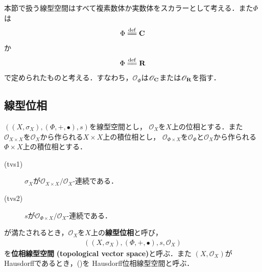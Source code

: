 	本節で扱う線型空間はすべて複素数体か実数体をスカラーとして考える．また$\Phi$は
	\begin{align}
		\Phi \defeq \C
	\end{align}
	か
	\begin{align}
		\Phi \defeq \R
	\end{align}
	で定められたものと考える．すなわち，$\mathscr{O}_\Phi$は$\mathscr{O}_{\mathbf{C}}$または$\mathscr{O}_{\mathbf{R}}$を指す．
	
\subsection{線型位相}
	\begin{screen}
		\begin{dfn}[位相線型空間]\label{def:topological_vector_space}
			$\left(\left(X,\sigma_X\right),(\Phi,+,\bullet),s\right)$を線型空間とし，
			$\mathscr{O}_X$を$X$上の位相とする．また
			$\mathscr{O}_{X \times X}$を$\mathscr{O}_X$から作られる$X \times X$上の積位相とし，
			$\mathscr{O}_{\Phi \times X}$を$\mathscr{O}_\Phi$と$\mathscr{O}_X$から作られる$\Phi \times X$上の積位相とする．
			\begin{description}
				\item[(tvs1)] $\sigma_X$が$\mathscr{O}_{X \times X}/\mathscr{O}_X$-連続である．
				\item[(tvs2)] $s$が$\mathscr{O}_{\Phi \times X}/\mathscr{O}_X$-連続である．
			\end{description}
			が満たされるとき，$\mathscr{O}_X$を$X$上の{\bf 線型位相}と呼び，
			\begin{align}
				\left(\left(X,\sigma_X\right),(\Phi,+,\bullet),s,\mathscr{O}_X\right)
				\label{pair_topological_vector_space}
			\end{align}
			を{\bf 位相線型空間}
			{\bf (topological vector space)}と呼ぶ．また
			$(X,\mathscr{O}_X)$がHausdorffであるとき，()を
			Hausdorff位相線型空間と呼ぶ．
		\end{dfn}
	\end{screen}
	
